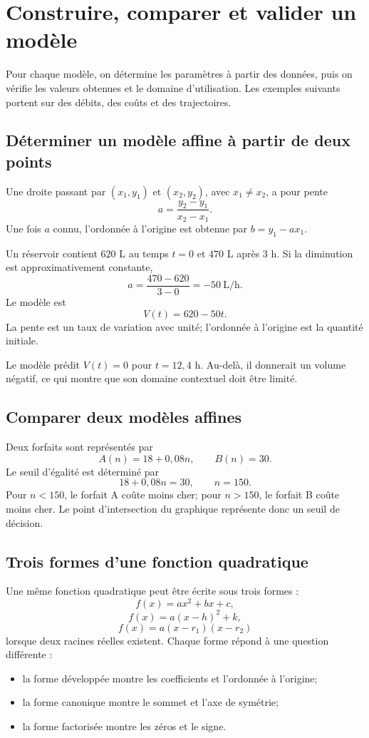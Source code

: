 \section{Construire, comparer et valider un modèle}
\label{manual:section:04.07}

Pour chaque modèle, on détermine les paramètres à partir des données, puis on vérifie les valeurs obtenues et le domaine d'utilisation. Les exemples suivants portent sur des débits, des coûts et des trajectoires.

\subsection{Déterminer un modèle affine à partir de deux points}

Une droite passant par $(x_1,y_1)$ et $(x_2,y_2)$, avec $x_1\neq x_2$, a pour pente
\[
a=\frac{y_2-y_1}{x_2-x_1}.
\]
Une fois $a$ connu, l'ordonnée à l'origine est obtenue par $b=y_1-ax_1$.

\begin{examplebox}
Un réservoir contient $620$ L au temps $t=0$ et $470$ L après $3$ h. Si la diminution est approximativement constante,
\[
a=\frac{470-620}{3-0}=-50\ \mathrm{L/h}.
\]
Le modèle est
\[
V(t)=620-50t.
\]
La pente est un taux de variation avec unité; l'ordonnée à l'origine est la quantité initiale.
\end{examplebox}

Le modèle prédit $V(t)=0$ pour $t=12{,}4$ h. Au-delà, il donnerait un volume négatif, ce qui montre que son domaine contextuel doit être limité.

\subsection{Comparer deux modèles affines}

Deux forfaits sont représentés par
\[
A(n)=18+0{,}08n,
\qquad
B(n)=30.
\]
Le seuil d'égalité est déterminé par
\[
18+0{,}08n=30,
\qquad n=150.
\]
Pour $n<150$, le forfait A coûte moins cher; pour $n>150$, le forfait B coûte moins cher. Le point d'intersection du graphique représente donc un seuil de décision.

\subsection{Trois formes d'une fonction quadratique}

Une même fonction quadratique peut être écrite sous trois formes :
\[
f(x)=ax^2+bx+c,
\]
\[
f(x)=a(x-h)^2+k,
\]
\[
f(x)=a(x-r_1)(x-r_2)
\]
lorsque deux racines réelles existent. Chaque forme répond à une question différente :
\begin{itemize}
\item la forme développée montre les coefficients et l'ordonnée à l'origine;
\item la forme canonique montre le sommet et l'axe de symétrie;
\item la forme factorisée montre les zéros et le signe.
\end{itemize}

